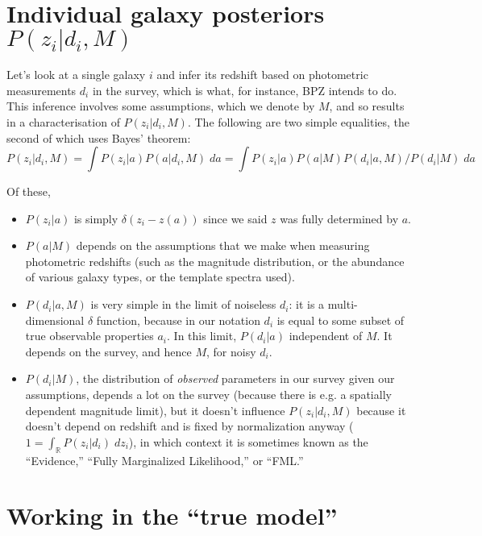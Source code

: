 \documentclass[11pt]{amsart}
\begin{document}

\section{Individual galaxy posteriors $P(z_i|d_i,M)$}

Let's look at a single galaxy $i$ and infer its redshift based on photometric measurements $d_i$ in the survey, which is what, for instance, BPZ intends to do. This inference involves some assumptions, which we denote by $M$, and so results in a characterisation of $P(z_i|d_i,M)$. The following are two simple equalities, the second of which uses Bayes' theorem:
\begin{equation}
P(z_i|d_i, M) = \int P(z_i|a) P(a|d_i, M) \; da = \int P(z_i|a) P(a|M) P(d_i|a,M) / P(d_i|M) \; da
\end{equation}

Of these,
\begin{itemize}
\item $P(z_i|a)$ is simply $\delta(z_i-z(a))$ since we said $z$ was fully determined by $a$.
\item $P(a|M)$ depends on the assumptions that we make when measuring photometric redshifts (such as the magnitude distribution, or the abundance of various galaxy types, or the template spectra used).
\item $P(d_i|a,M)$ is very simple in the limit of noiseless $d_i$: it is  a multi-dimensional $\delta$ function, because in our notation $d_i$ is equal to some subset of true observable properties $a_i$. In this limit, $P(d_i|a)$ independent of $M$. It depends on the survey, and hence $M$, for noisy $d_i$.
\item $P(d_i|M)$, the distribution of \emph{observed} parameters in our survey given our assumptions, depends a lot on the survey (because there is e.g. a spatially dependent magnitude limit), but it doesn't influence $P(z_i|d_i, M)$ because it doesn't depend on redshift and is fixed by normalization anyway ($1=\int_{\mathbb{R}} P(z_i|d_i)\; dz_i$), in which context it is sometimes known as the ``Evidence,'' ``Fully Marginalized Likelihood,'' or ``FML.''
\end{itemize}


\section{Working in the ``true model''}
\end{document}
